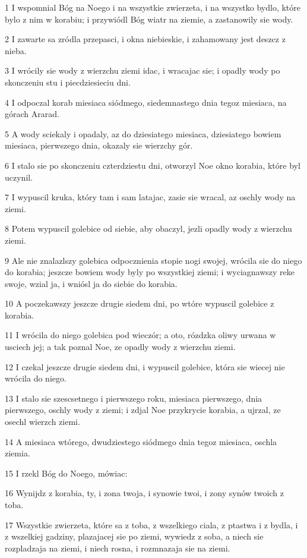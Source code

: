 \par 1 I wspomnial Bóg na Noego i na wszystkie zwierzeta, i na wszystko bydlo, które bylo z nim w korabiu; i przywiódl Bóg wiatr na ziemie, a zastanowily sie wody.
\par 2 I zawarte sa zródla przepasci, i okna niebieskie, i zahamowany jest deszcz z nieba.
\par 3 I wrócily sie wody z wierzchu ziemi idac, i wracajac sie; i opadly wody po skonczeniu stu i piecdziesieciu dni.
\par 4 I odpoczal korab miesiaca siódmego, siedemnastego dnia tegoz miesiaca, na górach Ararad.
\par 5 A wody sciekaly i opadaly, az do dziesiatego miesiaca, dziesiatego bowiem miesiaca, pierwszego dnia, okazaly sie wierzchy gór.
\par 6 I stalo sie po skonczeniu czterdziestu dni, otworzyl Noe okno korabia, które byl uczynil.
\par 7 I wypuscil kruka, który tam i sam latajac, zasie sie wracal, az oschly wody na ziemi.
\par 8 Potem wypuscil golebice od siebie, aby obaczyl, jezli opadly wody z wierzchu ziemi.
\par 9 Ale nie znalazlszy golebica odpocznienia stopie nogi swojej, wrócila sie do niego do korabia; jeszcze bowiem wody byly po wszystkiej ziemi; i wyciagnawszy reke swoje, wzial ja, i wniósl ja do siebie do korabia.
\par 10 A poczekawszy jeszcze drugie siedem dni, po wtóre wypuscil golebice z korabia.
\par 11 I wrócila do niego golebica pod wieczór; a oto, rózdzka oliwy urwana w usciech jej; a tak poznal Noe, ze opadly wody z wierzchu ziemi.
\par 12 I czekal jeszcze drugie siedem dni, i wypuscil golebice, która sie wiecej nie wrócila do niego.
\par 13 I stalo sie szescsetnego i pierwszego roku, miesiaca pierwszego, dnia pierwszego, oschly wody z ziemi; i zdjal Noe przykrycie korabia, a ujrzal, ze osechl wierzch ziemi.
\par 14 A miesiaca wtórego, dwudziestego siódmego dnia tegoz miesiaca, oschla ziemia.
\par 15 I rzekl Bóg do Noego, mówiac:
\par 16 Wynijdz z korabia, ty, i zona twoja, i synowie twoi, i zony synów twoich z toba.
\par 17 Wszystkie zwierzeta, które sa z toba, z wszelkiego ciala, z ptastwa i z bydla, i z wszelkiej gadziny, plazajacej sie po ziemi, wywiedz z soba, a niech sie rozpladzaja na ziemi, i niech rosna, i rozmnazaja sie na ziemi.
